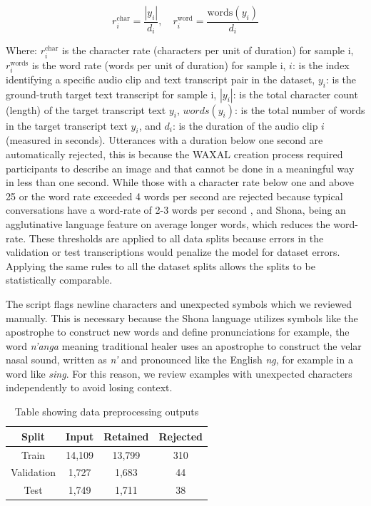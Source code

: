 {\begin{equation}
    r_i^{\text{char}} = \frac{|y_i|}{d_i}, \quad r_i^{\text{word}} = \frac{\text{words}(y_i)}{d_i}
\end{equation}

Where: 
 $r_i^{\text{char}}$ is the character rate (characters per unit of duration) for sample i,
 $r_i^{\text{words}}$ is the word rate (words per unit of duration) for sample i,
 $i$: is the index identifying a specific audio clip and text transcript pair in the dataset,
 $y_i$: is the ground-truth target text transcript for sample i,
 $|y_i|$: is the total character count (length) of the target transcript text $y_i$,
 $words(y_i)$: is the total number of words in the target transcript text $y_i$, and
 $d_i$: is the duration of the audio clip $i$ (measured in seconds).
Utterances with a duration below one second are automatically rejected, this is because the WAXAL creation process required participants to describe an image and that cannot be done in a meaningful way in less than one second. While those with a character rate below one and above 25 or the word rate exceeded 4 words per second are rejected because typical conversations have a word-rate of 2-3 words per second \citep{Yuan2006}, and Shona, being an agglutinative language feature on average longer words, which reduces the word-rate. These thresholds are applied to all data splits because errors in the validation or test transcriptions would penalize the model for dataset errors. Applying the same rules to all the dataset splits allows the splits to be statistically comparable. 

The script flags newline characters and unexpected symbols which we reviewed manually. This is necessary because the Shona language utilizes symbols like the apostrophe to construct new words and define pronunciations for example, the word \emph{n'anga} meaning traditional healer uses an apostrophe to construct the velar nasal sound, written as \emph{n'} and pronounced like the English \emph{ng}, for example in a word like \emph{sing}. For this reason, we review examples with unexpected characters independently to avoid losing context.


\begin{table}
    \centering
    \begin{tabular}{|c|c|c|c|}
        \hline
        Split & Input & Retained & Rejected\\
        \hline
        Train & 14,109 & 13,799 & 310 \\
        \hline
        Validation & 1,727 & 1,683 & 44 \\
        \hline
        Test & 1,749 & 1,711 & 38 \\
        \hline
    \end{tabular}
    \caption{Table showing data preprocessing outputs}
    \label{tab:placeholder}
\end{table}


}
